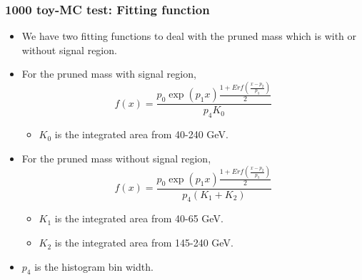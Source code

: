 \documentclass{beamer}
\begin{document}
\begin{frame}
  \frametitle{1000 toy-MC test: Fitting function}
  \justifying
  \begin{footnotesize}
    \begin{itemize}
    \item We have two fitting functions to deal with the pruned mass which is with or without signal region.
    \item For the pruned mass with signal region,
      \[f(x) = \frac{p_0\exp(p_1 x)\frac{1+Erf(\frac{x-p_2}{p_3})}{2}}{p_4 K_0}\]
      \begin{itemize}
      \item $K_0$ is the integrated area from 40-240 GeV.
      \end{itemize}
    \item For the pruned mass without signal region,
      \[f(x) = \frac{p_0\exp(p_1 x)\frac{1+Erf(\frac{x-p_2}{p_3})}{2}}{p_4(K_1+K_2)}\]
      \begin{itemize}
      \item $K_1$ is the integrated area from 40-65 GeV. 
      \item $K_2$ is the integrated area from 145-240 GeV.
      \end{itemize}
    \item $p_4$ is the histogram bin width.
    \end{itemize}
  \end{footnotesize}
\end{frame}
\end{document}
